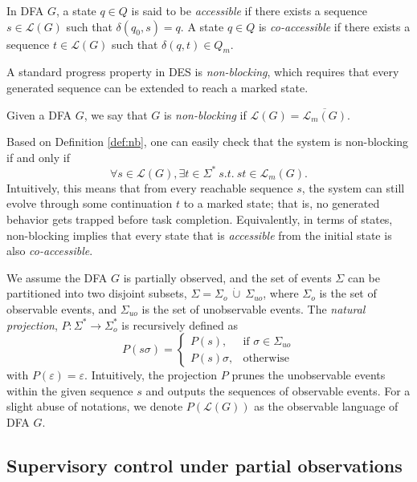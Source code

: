 \documentclass[journal,twoside,web]{ieeecolor}
\begin{document}
In DFA $G$, 
a state $q \in Q$ is said to be \emph{accessible} if there exists a sequence $s \in \mathcal{L}(G)$ such that $\delta(q_0, s) = q$.  
A state $q \in Q$ is \emph{co-accessible} if there exists a sequence $t \in \mathcal{L}(G)$ such that $\delta(q, t) \in Q_m$.

A standard progress property in DES is \emph{non-blocking}, which requires that every generated sequence can be extended to reach a marked state.
\begin{definition}
    Given a DFA $G$, we say that $G$ is \emph{non-blocking} if
    $
    \mathcal{L}(G) = \overline{\mathcal{L}_m(G)}.
    $
    \label{def:nb}
\end{definition}
%
Based on Definition \ref{def:nb}, one can easily check that the system is non-blocking if and only if 
\begin{equation}
    \forall s \in \mathcal{L}(G), \exists t \in \Sigma^* \ s.t. \ st \in \mathcal{L}_m(G).
    \label{eq:nb_1}
\end{equation}
%
Intuitively, this means that from every reachable sequence $s$, the system can still evolve through some continuation $t$ to a marked state; that is, no generated behavior gets trapped before task completion.
Equivalently, in terms of states, non-blocking implies that every state that is \emph{accessible} from the initial state is also \emph{co-accessible}.


We assume the DFA $G$ is partially observed, and the set of events $\Sigma$ can be partitioned into two disjoint subsets, $\Sigma = \Sigma_o \ \dot{\cup} \ \Sigma_{uo}$, where $\Sigma_o$ is the set of observable events, and $\Sigma_{uo}$ is the set of unobservable events.
%
The \emph{natural projection}, $P : \Sigma^* \rightarrow \Sigma_{o}^*$ is recursively defined as
\begin{equation}
P(s \sigma) =
\begin{cases}
P(s), & \text{if } \sigma \in \Sigma_{uo} \\
P(s)\sigma, & \text{otherwise}
\end{cases}
\label{eq:proj}
\end{equation}
with
$P(\varepsilon)  = \varepsilon$.
Intuitively, the projection $P$ prunes the unobservable events within the given sequence $s$ and outputs the sequences of observable events.
For a slight abuse of notations, we denote $P(\mathcal{L}(G))$ as the observable language of DFA $G$.

\subsection{Supervisory control under partial observations}
\end{document}
